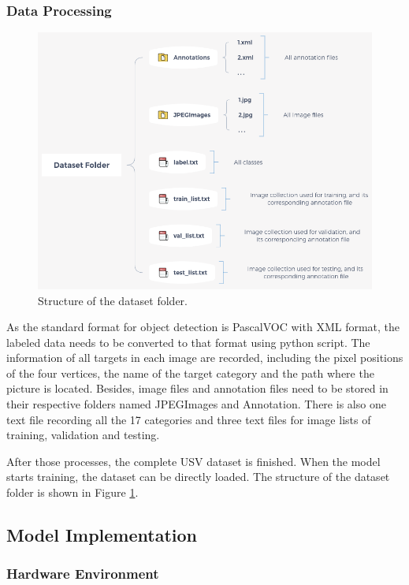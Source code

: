 \documentclass[sensors,article,submit,moreauthors,pdftex]{Definitions/mdpi}
\begin{document}
\begin{paracol}{2}
\subsubsection{Data Processing}
\begin{figure}[htbp]
\centering
\includegraphics[width=1\columnwidth]{images/dataset-folder.png}
\caption{Structure of the dataset folder.}
\label{fig:Structure of the dataset folder}
\end{figure}

As the standard format for object detection is PascalVOC with XML format, the labeled data needs to be converted to that format using python script. The information of all targets in each image are recorded, including the pixel positions of the four vertices, the name of the target category and the path where the picture is located.
Besides, image files and annotation files need to be stored in their respective folders named JPEGImages and Annotation. There is also one text file recording all the 17 categories and three text files for image lists of training, validation and testing.

After those processes, the complete USV dataset is finished. When the model starts training, the dataset can be directly loaded. The structure of the dataset folder is shown in Figure \ref{fig:Structure of the dataset folder}.


\subsection{Model Implementation}

\subsubsection{Hardware Environment}


\end{paracol}
\end{document}
